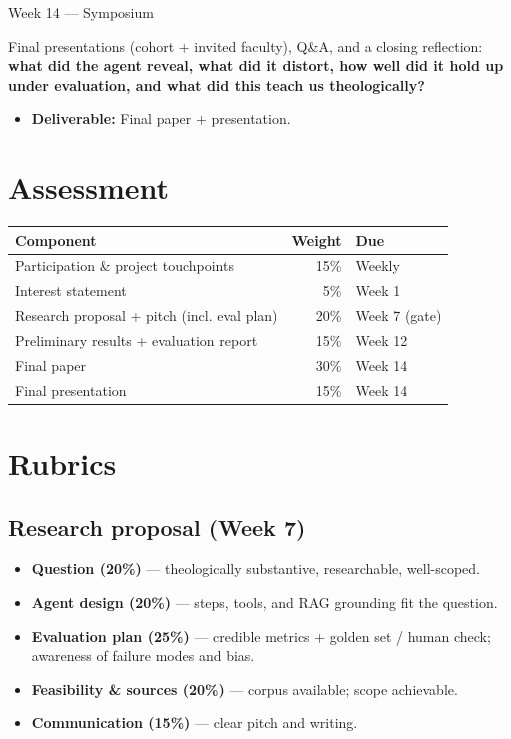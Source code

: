 \documentclass[11pt]{article}
\newcommand{\phase}[1]{%
  \vspace{0.8em}
  \noindent\colorbox{primary}{\parbox{\dimexpr\textwidth-2\fboxsep}{%
    \color{white}\bfseries\large\strut #1}}\par\vspace{0.5em}}
\begin{document}
\phase{Week 14 --- Symposium}
Final presentations (cohort + invited faculty), Q\&A, and a closing reflection: \textbf{what did the
agent reveal, what did it distort, how well did it hold up under evaluation, and what did this
teach us theologically?}
\begin{itemize}[leftmargin=1.4em,topsep=2pt]
  \item \textbf{Deliverable:} Final paper + presentation.
\end{itemize}

\section{Assessment}
\begin{tabularx}{\textwidth}{@{}Y r l@{}}
\toprule
\textbf{Component} & \textbf{Weight} & \textbf{Due} \\
\midrule
Participation \& project touchpoints & 15\% & Weekly \\
Interest statement & 5\% & Week 1 \\
Research proposal + pitch (incl. eval plan) & 20\% & Week 7 (gate) \\
Preliminary results + evaluation report & 15\% & Week 12 \\
Final paper & 30\% & Week 14 \\
Final presentation & 15\% & Week 14 \\
\bottomrule
\end{tabularx}

\section{Rubrics}

\subsection*{Research proposal (Week 7)}
\begin{itemize}[leftmargin=1.4em,itemsep=1pt]
  \item \textbf{Question (20\%)} --- theologically substantive, researchable, well-scoped.
  \item \textbf{Agent design (20\%)} --- steps, tools, and RAG grounding fit the question.
  \item \textbf{Evaluation plan (25\%)} --- credible metrics + golden set / human check; awareness of failure
    modes and bias.
  \item \textbf{Feasibility \& sources (20\%)} --- corpus available; scope achievable.
  \item \textbf{Communication (15\%)} --- clear pitch and writing.
\end{itemize}
\end{document}
